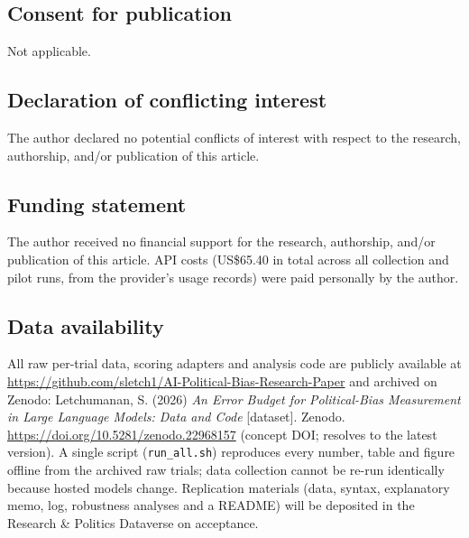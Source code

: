 \documentclass[12pt]{article}
\begin{document}
\subsection*{Consent for publication}
Not applicable.
\subsection*{Declaration of conflicting interest}
The author declared no potential conflicts of interest with respect to the research, authorship, and/or publication of
this article.
\subsection*{Funding statement}
The author received no financial support for the research, authorship, and/or publication of this article. API costs
(US\$65.40 in total across all collection and pilot runs, from the provider's usage records) were paid personally by the author.
\subsection*{Data availability}
All raw per-trial data, scoring adapters and analysis code are publicly available at
\url{https://github.com/sletch1/AI-Political-Bias-Research-Paper} and archived on Zenodo:
Letchumanan, S. (2026) \emph{An Error Budget for Political-Bias Measurement in Large Language Models: Data and Code}
[dataset]. Zenodo. \url{https://doi.org/10.5281/zenodo.22968157} (concept DOI; resolves to the latest version). A single
script (\texttt{run\_all.sh}) reproduces every number, table and figure offline from the archived raw trials; data
collection cannot be re-run identically because hosted models change. Replication materials (data, syntax, explanatory
memo, log, robustness analyses and a README) will be deposited in the Research \& Politics Dataverse on acceptance.
\end{document}
